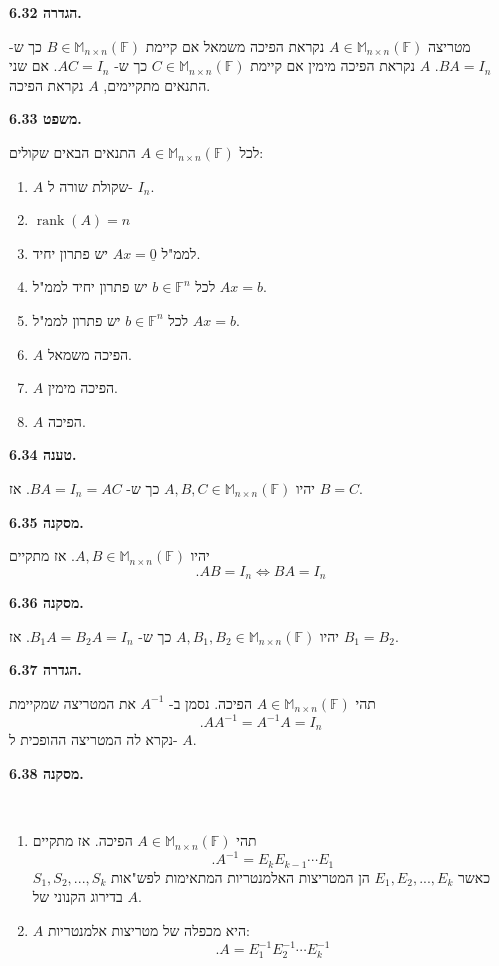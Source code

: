 \documentclass[12pt]{report}
\theoremstyle{plain}
\theoremstyle{definition}
\newcommand{\F}{\mathbb{F}}
\DeclareMathOperator{\rank}{rank}
\newcommand{\M}{\mathbb{M}}
\newcommand{\0}{\mathbf{0}}
\begin{document}
\noindent\textbf{הגדרה 6.32.}

מטריצה 
$A\in\M_{n\times n}(\F)$
נקראת הפיכה משמאל אם קיימת
$B\in\M_{n\times n}(\F)$
כך ש-
$BA=I_n$.
$A$
נקראת הפיכה מימין אם קיימת
$C\in\M_{n\times n}(\F)$
כך ש-
$AC=I_n$.
אם שני התנאים מתקיימים, 
$A$
נקראת הפיכה.
\bigskip
\bigskip

\noindent\textbf{משפט 6.33.}

לכל
$A\in\M_{n\times n}(\F)$
התנאים הבאים שקולים:
\begin{enumerate}[label=(\alph*)]
\item 
$A$
שקולת שורה ל-
$I_n$.


\item 
$\rank(A)=n$


\item 
לממ"ל
$Ax=\underline{0}$
יש פתרון יחיד.


\item 
לכל
$b\in\F^n$
יש פתרון יחיד לממ"ל
$Ax=b$.


\item 
לכל
$b\in\F^n$
יש פתרון לממ"ל
$Ax=b$.


\item 
$A$
הפיכה משמאל.

\item 
$A$
הפיכה מימין.

\item 
$A$
הפיכה.


\end{enumerate}
\bigskip
\bigskip

\noindent\textbf{טענה 6.34.}

יהיו 
$A,B,C\in\M_{n\times n}(\F)$ 
כך ש-
$BA=I_n=AC$.
אז
$B=C$.
\bigskip
\bigskip

\noindent\textbf{מסקנה 6.35.}

יהיו 
$A,B\in\M_{n\times n}(\F)$.
אז מתקיים
$$
.AB=I_n \iff BA=I_n
$$
\bigskip
\bigskip

\noindent\textbf{מסקנה 6.36.}

יהיו
$A,B_1,B_2\in\M_{n\times n}(\F)$
כך ש-
$B_1A=B_2A=I_n$.
אז 
$B_1=B_2$.
\bigskip
\bigskip

\noindent\textbf{הגדרה 6.37.}

תהי
$A\in\M_{n\times n}(\F)$
הפיכה. נסמן ב-
$A^{-1}$
את המטריצה שמקיימת
$$
.AA^{-1}=A^{-1}A=I_n
$$
נקרא לה המטריצה ההופכית ל-
$A$.
\bigskip
\bigskip

\noindent\textbf{מסקנה 6.38.}

\label{cor:elementary-product}\
\begin{enumerate}[label=\alph*.]
\item
תהי 
$A\in\M_{n\times n}(\F)$
הפיכה. אז מתקיים
$$
.A^{-1}=E_kE_{k-1}\cdots E_1
$$
כאשר
$E_1,E_2,...,E_k$
הן המטריצות האלמנטריות המתאימות לפש"אות
$S_1,S_2,...,S_k$
בדירוג הקנוני של 
$A$.


\item 
$A$
היא מכפלה של מטריצות אלמנטריות:
$$
.A=E_1^{-1}E_2^{-1}\cdots E_k^{-1}
$$


\end{enumerate}
\bigskip
\bigskip
\end{document}
